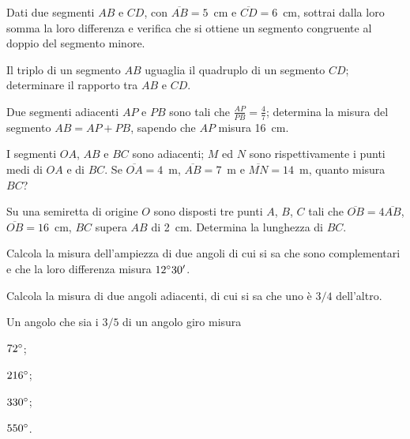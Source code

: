 \begin{multicols}{2}
\begin{esercizio}
\label{ese:1.105}
Dati due segmenti $AB$ e $CD$, con $\overline{AB} = 5$~cm e $\overline{CD} = 6$~cm, sottrai dalla loro somma la loro differenza e verifica che si ottiene un segmento congruente al doppio del segmento minore.
\end{esercizio}

\begin{esercizio}
\label{ese:1.106}
Il triplo di un segmento $AB$ uguaglia il quadruplo di un segmento $CD$; determinare il rapporto tra $AB$ e $CD$.
\end{esercizio}

\begin{esercizio}
\label{ese:1.107}
Due segmenti adiacenti $AP$ e $PB$ sono tali che $\frac{AP}{PB}=\frac{4}{7}$; determina la misura del segmento $AB=AP+PB$, sapendo che $AP$ misura 16~cm.
\end{esercizio}

\begin{esercizio}
\label{ese:1.108}
I segmenti $OA$, $AB$ e $BC$ sono adiacenti; $M$ ed $N$ sono rispettivamente i punti medi di $OA$ e di $BC$. Se $\overline{OA}=4$~m, $\overline{AB}=7$~m e $\overline{MN}=14$~m, quanto misura $BC$?
\end{esercizio}

\begin{esercizio}
\label{ese:1.109}
Su una semiretta di origine $O$ sono disposti tre punti $A$, $B$, $C$ tali che $\overline{OB}=4\overline{AB}$, $\overline{OB}=16$~cm, $BC$ supera $AB$ di 2~cm. Determina la lunghezza di $BC$.
\end{esercizio}

\begin{esercizio}
\label{ese:1.110}
Calcola la misura dell'ampiezza di due angoli di cui si sa che sono complementari e che la loro differenza misura $12{}^{\circ}30'$.
\end{esercizio}
 
\begin{esercizio}
\label{ese:1.111}
Calcola la misura di due angoli adiacenti, di cui si sa che uno è $3/4$ dell'altro.
\end{esercizio}

\begin{esercizio}
\label{ese:1.112}
Un angolo che sia i $3/5$ di un angolo giro misura
\begin{multicols}{2}
\begin{enumeratea}
\item $72{}^{\circ}$;	\item $216{}^{\circ}$;	\item $330{}^{\circ}$;	\item $550{}^{\circ}$.
\end{enumeratea}
\end{multicols}
\end{esercizio}


\end{multicols}
